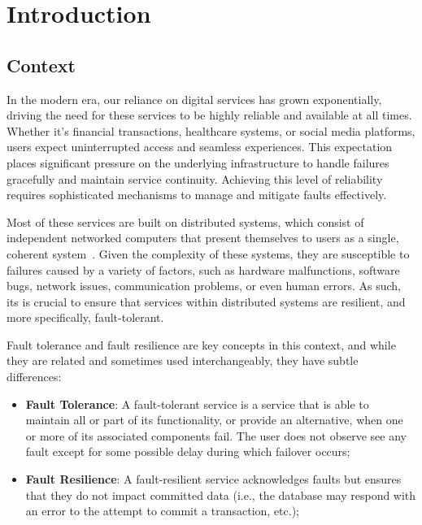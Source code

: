 \chapter{Introduction}\label{ch:introduction}


\section{Context}\label{sec:context}

In the modern era, our reliance on digital services has grown exponentially, driving the need for these services to be highly reliable and available at all times.
Whether it's financial transactions, healthcare systems, or social media platforms, users expect uninterrupted access and seamless experiences.
This expectation places significant pressure on the underlying infrastructure to handle failures gracefully and maintain service continuity. Achieving this level of reliability requires sophisticated mechanisms to manage and mitigate faults effectively.

Most of these services are built on distributed systems,
which consist of independent networked computers that present themselves to users as a single,
coherent system~\cite{fcc-distributed-systems}.
Given the complexity of these systems, they are susceptible to failures caused by a variety of factors, such as hardware malfunctions, software bugs, network issues, communication problems, or even human errors.
As such, its is crucial to ensure that services within distributed systems are resilient, and more specifically, fault-tolerant.

Fault tolerance and fault resilience are key concepts in this context, and while they are related and sometimes used interchangeably, they have subtle differences:

\begin{itemize}
    \item {\textbf{Fault Tolerance}}:
    A fault-tolerant service is a service that is able to maintain all or part of its functionality,
    or provide an alternative, when one or more of its associated components fail.
    The user does not observe see any fault except for some possible delay during which failover occurs;
    \item {\textbf{Fault Resilience}}: A fault-resilient service acknowledges faults but ensures that they do not impact committed data (i.e., the database may respond with an error to the attempt to commit a transaction, etc.);
\end{itemize}

